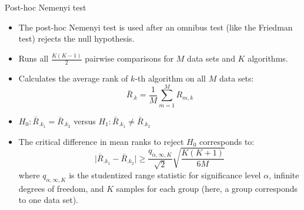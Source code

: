 \documentclass[11pt,compress,t,notes=noshow, aspectratio=169, xcolor=table]{beamer}
\begin{document}
\begin{frame}{Post-hoc Nemenyi test}

\begin{itemize}
\setlength\itemsep{1em}
\item The post-hoc Nemenyi test is used after an omnibus test (like the Friedman test) rejects the null hypothesis.
\item Runs all $\frac{K(K-1)}{2}$ pairwise comparisons for $M$ data sets and $K$ algorithms.
\item Calculates the average rank of $k$-th algorithm on all $M$ data sets:
$$
\bar{R}_{.k} =\frac{1}{M} \sum_{m=1}^M R_{m, k}
$$
\item $H_0: \bar{R}_{.k_1} = \bar{R}_{.k_2}$ versus
$H_1: \bar{R}_{.k_1} \neq \bar{R}_{.k_2}$
\item The critical difference in mean ranks to reject $H_0$ corresponds to:
$$
\vert \bar{R}_{.k_1} - \bar{R}_{.k_2} \vert \geq \frac{q_{\alpha, \infty, K}}{\sqrt{2}} \sqrt{\frac{K(K + 1)}{6M}}
$$
where $q_{\alpha, \infty, K}$ is the studentized range statistic for significance level $\alpha$, infinite degrees of freedom, and $K$ samples for each group (here, a group corresponds to one data set).
\end{itemize}
\end{frame}
\end{document}
